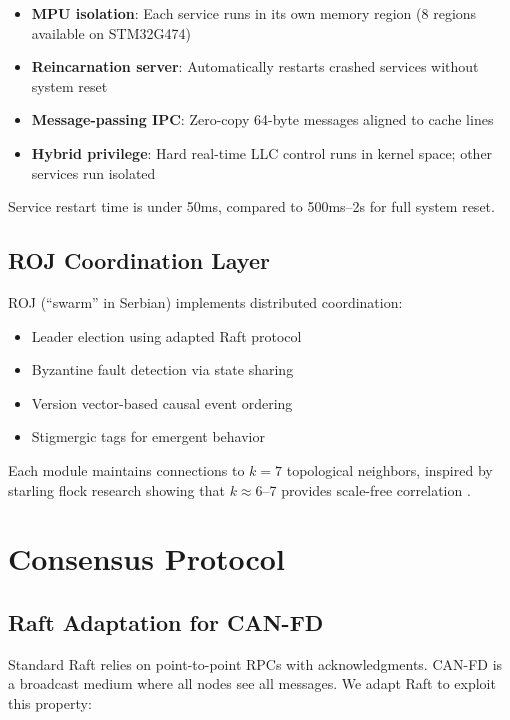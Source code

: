 \documentclass[conference,10pt]{IEEEtran}
\begin{document}
\begin{itemize}
    \item \textbf{MPU isolation}: Each service runs in its own memory region (8 regions available on STM32G474)
    \item \textbf{Reincarnation server}: Automatically restarts crashed services without system reset
    \item \textbf{Message-passing IPC}: Zero-copy 64-byte messages aligned to cache lines
    \item \textbf{Hybrid privilege}: Hard real-time LLC control runs in kernel space; other services run isolated
\end{itemize}

Service restart time is under 50ms, compared to 500ms--2s for full system reset.

\subsection{ROJ Coordination Layer}

ROJ (``swarm'' in Serbian) implements distributed coordination:
\begin{itemize}
    \item Leader election using adapted Raft protocol
    \item Byzantine fault detection via state sharing
    \item Version vector-based causal event ordering
    \item Stigmergic tags for emergent behavior
\end{itemize}

Each module maintains connections to $k=7$ topological neighbors, inspired by starling flock research showing that $k \approx 6$--7 provides scale-free correlation \cite{ballerini2008interaction}.

\section{Consensus Protocol}
\label{sec:consensus}

\subsection{Raft Adaptation for CAN-FD}

Standard Raft relies on point-to-point RPCs with acknowledgments. CAN-FD is a broadcast medium where all nodes see all messages. We adapt Raft to exploit this property:
\end{document}
